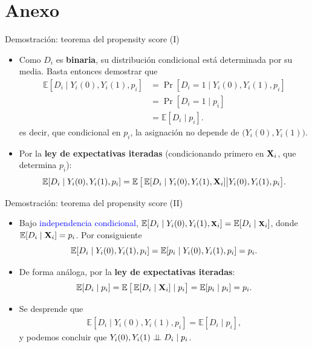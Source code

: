 \documentclass[10pt, xcolor=dvipsnames]{beamer}
\begin{document}

\section{Anexo}

\begin{frame}{Demostración: teorema del propensity score (I)}\label{Demostracion-PS}
\begin{itemize}
    \item Como \(D_i\) es \textbf{binaria}, su distribución condicional está determinada por su media. Basta entonces demostrar que
    \[
    \begin{aligned}
    \mathbb{E}[D_i \mid Y_i(0), Y_i(1), p_i]
    &= \Pr[D_i=1 \mid Y_i(0), Y_i(1), p_i] \\
    &= \Pr[D_i=1 \mid p_i] \\
    &= \mathbb{E}[D_i \mid p_i].
    \end{aligned}
    \]
    es decir, que condicional en \(p_i\), la asignación no depende de \(\big(Y_i(0), Y_i(1)\big)\).
    \vspace{0.5em}
    \item Por la \textbf{ley de expectativas iteradas} (condicionando primero en \(\textbf{X}_i\), que determina \(p_i\)):
    \[
        \operatorname{\mathbb{E}}[D_i \mid Y_i(0), Y_i(1), p_i]
        = \operatorname{\mathbb{E}}\big[\operatorname{\mathbb{E}}[D_i \mid Y_i(0), Y_i(1), \textbf{X}_i] \big| Y_i(0), Y_i(1), p_i \big].
    \]
\end{itemize}
\end{frame}


\begin{frame}{Demostración: teorema del propensity score (II)}
\begin{itemize}
    \item Bajo \textcolor{blue}{independencia condicional}, \(\fontvid \EX[D_i \mid Y_i(0), Y_i(1), \XB_i] = \EX[D_i \mid \XB_i]\), donde \(\operatorname{\mathbb{E}}[D_i \mid \textbf{X}_i] = p_i\). Por consiguiente
    \[
        \operatorname{\mathbb{E}}[D_i \mid Y_i(0), Y_i(1), p_i] = \operatorname{\mathbb{E}}[p_i \mid Y_i(0), Y_i(1), p_i] = p_i.
    \]
    \item De forma análoga, por la \textbf{ley de expectativas iteradas}:
    \[
        \operatorname{\mathbb{E}}[D_i \mid p_i] = \operatorname{\mathbb{E}}\big[\operatorname{\mathbb{E}}[D_i \mid \textbf{X}_i] \mid p_i\big] = \operatorname{\mathbb{E}}[p_i \mid p_i] = p_i.
    \]
    \item Se desprende que
    \[
    \begin{aligned}
    \mathbb{E}[D_i \mid Y_i(0), Y_i(1), p_i]
    = \mathbb{E}[D_i \mid p_i],
    \end{aligned}
    \]    
    y podemos concluir que \(Y_i(0), Y_i(1) \perp \!\!\! \perp D_i \mid p_i\).
\end{itemize}
\hyperlink{DIAP:PS}{{}}
\end{frame}
\end{document}
